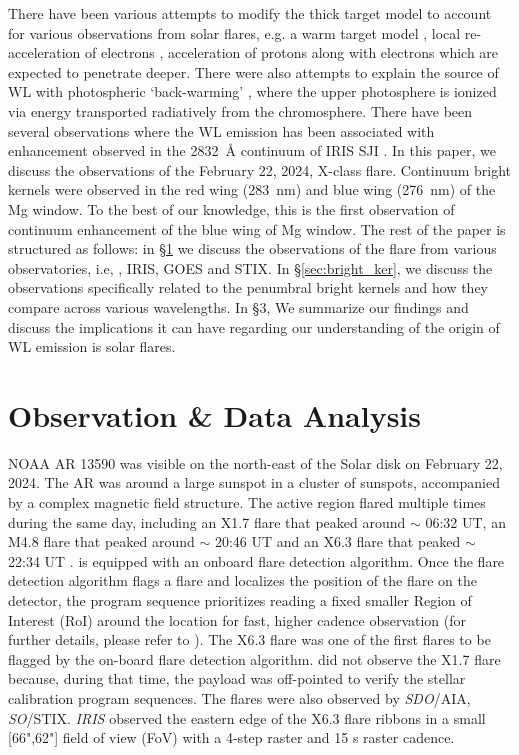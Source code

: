 There have been various attempts to modify the thick target model to account for various observations from solar flares, e.g. a warm target model \cite{kontar15,kontar19}, local re-acceleration of electrons \citep{brown73}, acceleration of protons along with electrons which are expected to penetrate deeper. There were also attempts to explain the source of WL with photospheric `back-warming' \citep{metclaff90}, where the upper photosphere is ionized via energy transported radiatively from the chromosphere. There have been several observations where the WL emission has been associated with enhancement observed in the 2832~{\AA} continuum of IRIS SJI \citep{heinzel14,kleint16,kleint17,kowalski17,kowalski19}. In this paper, we discuss the {\suit} observations of the February 22, 2024, X-class flare. Continuum bright kernels were observed in the red wing (283~nm) and blue wing (276~nm) of the Mg window. To the best of our knowledge, this is the first observation of continuum enhancement of the blue wing of Mg window. The rest of the paper is structured as follows: in \S\ref{sec:obs} we discuss the observations of the flare from various observatories, i.e, {\suit}, IRIS, GOES and STIX. In \S\ref{sec:bright_ker}, we discuss the observations specifically related to the penumbral bright kernels and how they compare across various wavelengths. In \S3, We summarize our findings and discuss the implications it can have regarding our understanding of the origin of WL emission is solar flares.

\section{Observation \& Data Analysis}\label{sec:obs}

NOAA AR 13590 was visible on the north-east of the Solar disk on February 22, 2024. The AR was around a large sunspot in a cluster of sunspots, accompanied by a complex magnetic field structure. The active region flared multiple times during the same day, including an X1.7 flare that peaked around $\sim$ 06:32 UT, an M4.8 flare that peaked around $\sim$ 20:46 UT and an X6.3 flare that peaked $\sim$ 22:34 UT . {\suit} is equipped with an onboard flare detection algorithm. Once the flare detection algorithm flags a flare and localizes the position of the flare on the detector, the program sequence prioritizes reading a fixed smaller Region of Interest (RoI) around the location for fast, higher cadence observation (for further details, please refer to \cite{flare_det}). The X6.3 flare was one of the first flares to be flagged by the on-board flare detection algorithm. {\suit} did not observe the X1.7 flare because, during that time, the payload was off-pointed to verify the stellar calibration program sequences. The flares were also observed by {\it SDO}/AIA, {\it SO}/STIX. {\it IRIS} observed the eastern edge of the X6.3 flare ribbons in a small [66",62"] field of view (FoV) with a 4-step raster and 15 s raster cadence.

